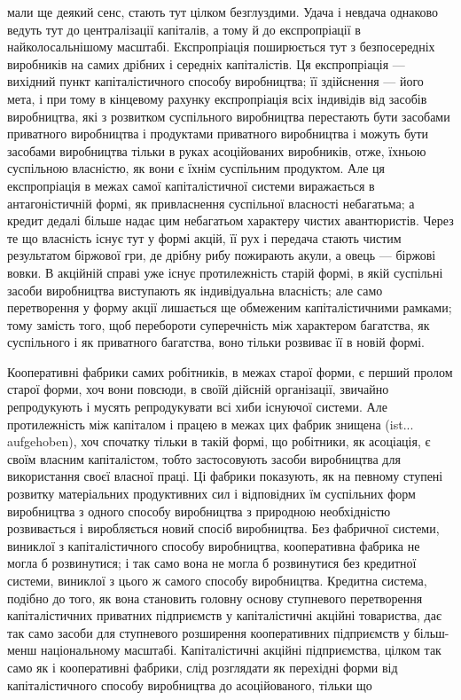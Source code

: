 \parcont{}  %
мали ще деякий сенс, стають тут цілком безглуздими. Удача
і невдача однаково ведуть тут до централізації капіталів,
а тому й до експропріації в найколосальнішому масштабі. Експропріація поширюється тут з
безпосередніх виробників на
самих дрібних і середніх капіталістів. Ця експропріація — вихідний пункт капіталістичного способу
виробництва; її здійснення — його мета, і при тому в кінцевому рахунку експропріація всіх індивідів
від засобів виробництва, які з розвитком
суспільного виробництва перестають бути засобами приватного
виробництва і продуктами приватного виробництва і можуть
бути засобами виробництва тільки в руках асоційованих виробників, отже, їхньою суспільною власністю,
як вони є їхнім суспільним
продуктом. Але ця експропріація в межах самої капіталістичної
системи виражається в антагоністичній формі, як привласнення
суспільної власності небагатьма; а кредит дедалі більше надає
цим небагатьом характеру чистих авантюристів. Через те що
власність існує тут у формі акцій, її рух і передача стають
чистим результатом біржової гри, де дрібну рибу пожирають
акули, а овець — біржові вовки. В акційній справі уже існує
протилежність старій формі, в якій суспільні засоби виробництва
виступають як індивідуальна власність; але само перетворення
у форму акції лишається ще обмеженим капіталістичними рамками; тому замість того, щоб перебороти
суперечність між
характером багатства, як суспільного і як приватного багатства, воно тільки розвиває її в новій
формі.

Кооперативні фабрики самих робітників, в межах старої
форми, є перший пролом старої форми, хоч вони повсюди,
в своїй дійсній організації, звичайно репродукують і мусять
репродукувати всі хиби існуючої системи. Але протилежність між
капіталом і працею в межах цих фабрик знищена (ist... aufgehoben),
хоч спочатку тільки в такій формі, що робітники, як асоціація,
є своїм власним капіталістом, тобто застосовують засоби виробництва для використання своєї власної
праці. Ці фабрики показують, як на певному ступені розвитку матеріальних продуктивних сил і
відповідних їм суспільних форм виробництва з одного
способу виробництва з природною необхідністю розвивається і
виробляється новий спосіб виробництва. Без фабричної системи,
виниклої з капіталістичного способу виробництва, кооперативна фабрика не могла б розвинутися; і так
само вона не могла б
розвинутися без кредитної системи, виниклої з цього ж самого
способу виробництва. Кредитна система, подібно до того, як
вона становить головну основу ступневого перетворення капіталістичних приватних підприємств у
капіталістичні акційні товариства, дає так само засоби для ступневого розширення кооперативних
підприємств у більш-менш національному масштабі.
Капіталістичні акційні підприємства, цілком так само як і кооперативні фабрики, слід розглядати як
перехідні форми від капіталістичного способу виробництва до асоційованого, тільки що
\parbreak{}  %
